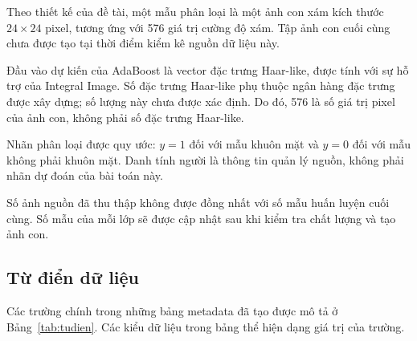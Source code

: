 \documentclass[12pt,a4paper,oneside]{report}
\begin{document}
Theo thiết kế của đề tài, một mẫu phân loại là một
ảnh con xám kích thước $24 \times 24$ pixel,
tương ứng với 576 giá trị cường độ xám.
Tập ảnh con cuối cùng chưa được tạo tại thời điểm
kiểm kê nguồn dữ liệu này.

Đầu vào dự kiến của AdaBoost là vector đặc trưng
Haar-like, được tính với sự hỗ trợ của Integral Image.
Số đặc trưng Haar-like phụ thuộc ngân hàng đặc trưng
được xây dựng; số lượng này chưa được xác định.
Do đó, 576 là số giá trị pixel của ảnh con,
không phải số đặc trưng Haar-like.

Nhãn phân loại được quy ước:
$y=1$ đối với mẫu khuôn mặt và
$y=0$ đối với mẫu không phải khuôn mặt.
Danh tính người là thông tin quản lý nguồn,
không phải nhãn dự đoán của bài toán này.

Số ảnh nguồn đã thu thập không được đồng nhất
với số mẫu huấn luyện cuối cùng.
Số mẫu của mỗi lớp sẽ được cập nhật sau khi
kiểm tra chất lượng và tạo ảnh con.

\subsection*{Từ điển dữ liệu}

Các trường chính trong những bảng metadata đã tạo
được mô tả ở Bảng~\ref{tab:tudien}.
Các kiểu dữ liệu trong bảng thể hiện dạng giá trị
của trường.
\end{document}
